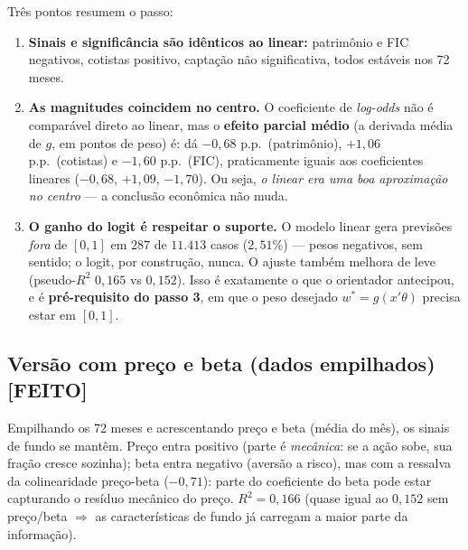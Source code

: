 \documentclass[11pt,a4paper]{article}
\newcommand{\feito}{\textcolor{feitog}{\textbf{[FEITO]}}}
\begin{document}
\noindent Três pontos resumem o passo:
\begin{enumerate}[topsep=2pt,itemsep=1pt]
\item \textbf{Sinais e significância são idênticos ao linear:} patrimônio e FIC negativos,
cotistas positivo, captação não significativa, todos estáveis nos 72 meses.
\item \textbf{As magnitudes coincidem no centro.} O coeficiente de \emph{log-odds} não é
comparável direto ao linear, mas o \textbf{efeito parcial médio} (a derivada média de $g$, em
pontos de peso) é: dá $-0{,}68$ p.p.\ (patrimônio), $+1{,}06$ p.p.\ (cotistas) e $-1{,}60$ p.p.\
(FIC), praticamente iguais aos coeficientes lineares ($-0{,}68$, $+1{,}09$, $-1{,}70$). Ou seja,
\emph{o linear era uma boa aproximação no centro} --- a conclusão econômica não muda.
\item \textbf{O ganho do logit é respeitar o suporte.} O modelo linear gera previsões
\emph{fora} de $[0,1]$ em $287$ de $11.413$ casos ($2{,}51\%$) --- pesos negativos, sem sentido;
o logit, por construção, nunca. O ajuste também melhora de leve (pseudo-$R^2$ $0{,}165$ vs
$0{,}152$). Isso é exatamente o que o orientador antecipou, e é \textbf{pré-requisito do passo 3},
em que o peso desejado $w^{*}=g(x'\theta)$ precisa estar em $[0,1]$.
\end{enumerate}

\subsection{Versão com preço e beta (dados empilhados) \feito}
Empilhando os 72 meses e acrescentando preço e beta (média do mês), os sinais de fundo se mantêm.
Preço entra positivo (parte é \emph{mecânica}: se a ação sobe, sua fração cresce sozinha); beta
entra negativo (aversão a risco), mas com a ressalva da colinearidade preço-beta ($-0{,}71$):
parte do coeficiente do beta pode estar capturando o resíduo mecânico do preço. $R^2=0{,}166$
(quase igual ao $0{,}152$ sem preço/beta $\Rightarrow$ as características de fundo já carregam a
maior parte da informação).
\end{document}
